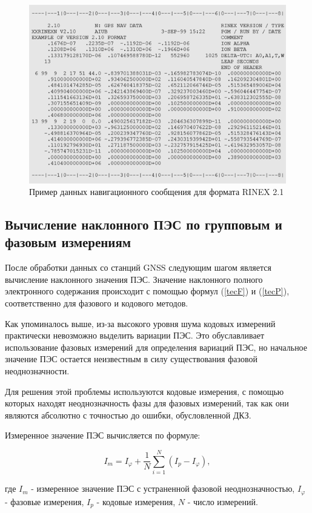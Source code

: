 \documentclass[14pt]{article}
\begin{document}
\begin{figure}[h!]
\centering
\includegraphics[width = 0.6\linewidth]{pics/rinex_nav.png}
\caption{Пример данных навигационного сообщения для формата RINEX 2.1}
\end{figure}


\newpage

\subsection{Вычисление наклонного ПЭС по групповым и фазовым измерениям}
После обработки данных со станций GNSS следующим шагом является вычисление наклонного значения ПЭС. Значение наклонного полного электронного содержания происходит с помощью формул (\ref{tecF}) и (\ref{tecP}), соответственно для фазового и кодового методов. 

Как упоминалось выше, из-за высокого уровня шума кодовых измерений практически невозможно выделить вариации ПЭС. Это обуславливает использование фазовых измерений для определения вариаций ПЭС, но начальное значение ПЭС остается неизвестным в силу существования фазовой неоднозначности.

Для решения этой проблемы используются кодовые измерения, с помощью которых находят неоднозначность фазы для фазовых измерений, так как они являются абсолютно с точностью до ошибки, обусловленной ДКЗ.

Измеренное значение ПЭС вычисляется по формуле:

\begin{equation}
I_{m} = I_{\varphi} + \frac{1}{N}\sum_{i=1}^N (I_p - I_{\varphi}),
\end{equation}

где $I_m$ - измеренное значение ПЭС с устраненной фазовой неоднозначностью, $I_\varphi$ - фазовые измерения, $I_p$ - кодовые измерения, $N$ - число измерений.  
\end{document}

